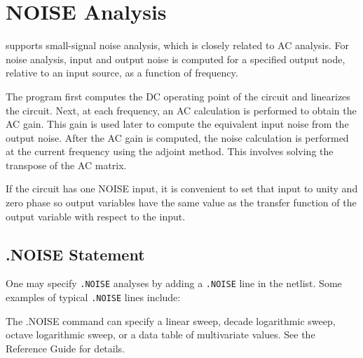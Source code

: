 \section{NOISE Analysis}
\label{NOISE_Analysis}
\label{NOISE_Sweep_Overview}
 
 

\Xyce{} supports small-signal noise analysis, which is closely related
to AC analysis. For noise analysis, input and output noise is computed
for a specified output node, relative to an input source, as a
function of frequency.

The program first computes the DC operating point of the circuit and
linearizes the circuit.  Next, at each frequency, an AC calculation is
performed to obtain the AC gain.  This gain is used later to compute
the equivalent input noise from the output noise.  After the AC gain
is computed, the noise calculation is performed at the current
frequency using the adjoint method.  This involves solving the
transpose of the AC matrix.


If the circuit has one NOISE input, it is convenient to set that input
to unity and zero phase so output variables have the same value as the
transfer function of the output variable with respect to the input.

\subsection{.NOISE Statement}

One may specify \verb|.NOISE| analyses by adding a \verb|.NOISE| line in the netlist.  
Some examples of typical \verb|.NOISE| lines include:


The .NOISE command can specify a linear sweep, decade logarithmic
sweep, octave logarithmic sweep, or a data table of multivariate
values. See the \Xyce{} Reference Guide\ReferenceGuide{} for details.

